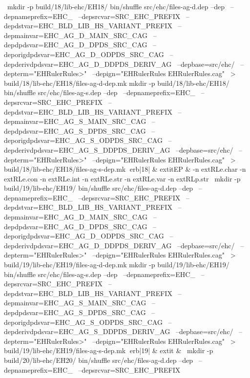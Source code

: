 \
mkdir -p build/18/lib-ehc/EH18/
bin/shuffle src/ehc/files-ag-d.dep --dep \
	  --depnameprefix=EHC_ \
	  --depsrcvar=SRC_EHC_PREFIX \
	  --depdstvar=EHC_BLD_LIB_HS_VARIANT_PREFIX \
	  --depmainvar=EHC_AG_D_MAIN_SRC_CAG \
	  --depdpdsvar=EHC_AG_D_DPDS_SRC_CAG \
	  --deporigdpdsvar=EHC_AG_D_ODPDS_SRC_CAG \
	  --depderivdpdsvar=EHC_AG_D_DDPDS_DERIV_AG \
	  --depbase=src/ehc/ \
	  --depterm="EHRulerRules>" \
	  --depign="EHRulerRules EHRulerRules.cag" \
	    > build/18/lib-ehc/EH18/files-ag-d-dep.mk
mkdir -p build/18/lib-ehc/EH18/
bin/shuffle src/ehc/files-ag-s.dep --dep \
	  --depnameprefix=EHC_ \
	  --depsrcvar=SRC_EHC_PREFIX \
	  --depdstvar=EHC_BLD_LIB_HS_VARIANT_PREFIX \
	  --depmainvar=EHC_AG_S_MAIN_SRC_CAG \
	  --depdpdsvar=EHC_AG_S_DPDS_SRC_CAG \
	  --deporigdpdsvar=EHC_AG_S_ODPDS_SRC_CAG \
	  --depderivdpdsvar=EHC_AG_S_DDPDS_DERIV_AG \
	  --depbase=src/ehc/ \
	  --depterm="EHRulerRules>" \
	  --depign="EHRulerRules EHRulerRules.cag" \
	    > build/18/lib-ehc/EH18/files-ag-s-dep.mk
erb|18| & 	extit{EP} & 
-n 	extRL{e.char}\hspace{.5em} 
-n 	extRL{e.con}\hspace{.5em} 
-n 	extRL{e.int}\hspace{.5em} 
-n 	extRL{e.str}\hspace{.5em} 
-n 	extRL{e.var}\hspace{.5em} 
-n 	extRL{p.str}\hspace{.5em} 
\
mkdir -p build/19/lib-ehc/EH19/
bin/shuffle src/ehc/files-ag-d.dep --dep \
	  --depnameprefix=EHC_ \
	  --depsrcvar=SRC_EHC_PREFIX \
	  --depdstvar=EHC_BLD_LIB_HS_VARIANT_PREFIX \
	  --depmainvar=EHC_AG_D_MAIN_SRC_CAG \
	  --depdpdsvar=EHC_AG_D_DPDS_SRC_CAG \
	  --deporigdpdsvar=EHC_AG_D_ODPDS_SRC_CAG \
	  --depderivdpdsvar=EHC_AG_D_DDPDS_DERIV_AG \
	  --depbase=src/ehc/ \
	  --depterm="EHRulerRules>" \
	  --depign="EHRulerRules EHRulerRules.cag" \
	    > build/19/lib-ehc/EH19/files-ag-d-dep.mk
mkdir -p build/19/lib-ehc/EH19/
bin/shuffle src/ehc/files-ag-s.dep --dep \
	  --depnameprefix=EHC_ \
	  --depsrcvar=SRC_EHC_PREFIX \
	  --depdstvar=EHC_BLD_LIB_HS_VARIANT_PREFIX \
	  --depmainvar=EHC_AG_S_MAIN_SRC_CAG \
	  --depdpdsvar=EHC_AG_S_DPDS_SRC_CAG \
	  --deporigdpdsvar=EHC_AG_S_ODPDS_SRC_CAG \
	  --depderivdpdsvar=EHC_AG_S_DDPDS_DERIV_AG \
	  --depbase=src/ehc/ \
	  --depterm="EHRulerRules>" \
	  --depign="EHRulerRules EHRulerRules.cag" \
	    > build/19/lib-ehc/EH19/files-ag-s-dep.mk
erb|19| & 	extit{} & 
\
mkdir -p build/20/lib-ehc/EH20/
bin/shuffle src/ehc/files-ag-d.dep --dep \
	  --depnameprefix=EHC_ \
	  --depsrcvar=SRC_EHC_PREFIX \

